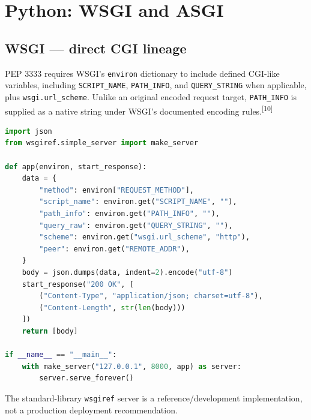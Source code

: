 \documentclass[10pt,letterpaper,oneside]{article}
\newcommand{\refs}[1]{\textsuperscript{\color{blue}[#1]}}
\newcommand{\code}[1]{\texttt{#1}}
\begin{document}
\section{Python: WSGI and ASGI}
\subsection{WSGI --- direct CGI lineage}
PEP 3333 requires WSGI's \code{environ} dictionary to include defined CGI-like variables, including \code{SCRIPT\_NAME}, \code{PATH\_INFO}, and \code{QUERY\_STRING} when applicable, plus \code{wsgi.url\_scheme}. Unlike an original encoded request target, \code{PATH\_INFO} is supplied as a native string under WSGI's documented encoding rules.\refs{10}
\begin{lstlisting}[language=Python,caption={Self-contained WSGI diagnostic application}]
import json
from wsgiref.simple_server import make_server

def app(environ, start_response):
    data = {
        "method": environ["REQUEST_METHOD"],
        "script_name": environ.get("SCRIPT_NAME", ""),
        "path_info": environ.get("PATH_INFO", ""),
        "query_raw": environ.get("QUERY_STRING", ""),
        "scheme": environ.get("wsgi.url_scheme", "http"),
        "peer": environ.get("REMOTE_ADDR"),
    }
    body = json.dumps(data, indent=2).encode("utf-8")
    start_response("200 OK", [
        ("Content-Type", "application/json; charset=utf-8"),
        ("Content-Length", str(len(body)))
    ])
    return [body]

if __name__ == "__main__":
    with make_server("127.0.0.1", 8000, app) as server:
        server.serve_forever()
\end{lstlisting}
The standard-library \code{wsgiref} server is a reference/development implementation, not a production deployment recommendation.
\end{document}
